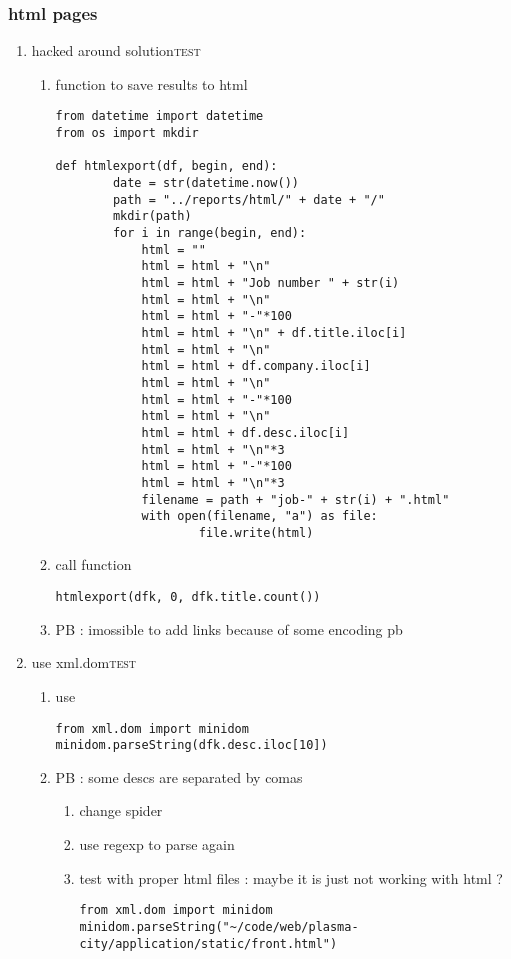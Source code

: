 \documentclass[11pt]{article}
\begin{document}
\subsubsection{html pages}
\label{sec:org46ffa8f}
\begin{enumerate}
\item hacked around solution\hfill{}\textsc{test}
\label{sec:org2b8d5c6}
\begin{enumerate}
\item function to save results to html
\label{sec:orge7554f5}
\begin{verbatim}
from datetime import datetime
from os import mkdir

def htmlexport(df, begin, end):
	    date = str(datetime.now())
	    path = "../reports/html/" + date + "/"
	    mkdir(path)
	    for i in range(begin, end):
			html = ""
			html = html + "\n"
			html = html + "Job number " + str(i)
			html = html + "\n"
			html = html + "-"*100
			html = html + "\n" + df.title.iloc[i]
			html = html + "\n"
			html = html + df.company.iloc[i]
			html = html + "\n"
			html = html + "-"*100
			html = html + "\n"
			html = html + df.desc.iloc[i]
			html = html + "\n"*3
			html = html + "-"*100
			html = html + "\n"*3
			filename = path + "job-" + str(i) + ".html"
			with open(filename, "a") as file:
				    file.write(html)
\end{verbatim}

\item call function
\label{sec:orgbfc9442}
\begin{verbatim}
htmlexport(dfk, 0, dfk.title.count())
\end{verbatim}
\item PB : imossible to add links because of some encoding pb
\label{sec:org578f566}
\end{enumerate}
\item use xml.dom\hfill{}\textsc{test}
\label{sec:org87b5fa2}
\begin{enumerate}
\item use
\label{sec:orge49e067}
\begin{verbatim}
from xml.dom import minidom
minidom.parseString(dfk.desc.iloc[10])
\end{verbatim}

\item PB : some descs are separated by comas
\label{sec:org92c00e8}
\begin{enumerate}
\item change spider
\label{sec:orgb898115}
\item use regexp to parse again
\label{sec:org302eac3}
\item test with proper html files : maybe it is just not working with html ?
\label{sec:org3326746}
\begin{verbatim}
from xml.dom import minidom
minidom.parseString("~/code/web/plasma-city/application/static/front.html")
\end{verbatim}
\end{enumerate}
\end{enumerate}


\end{enumerate}
\end{document}
